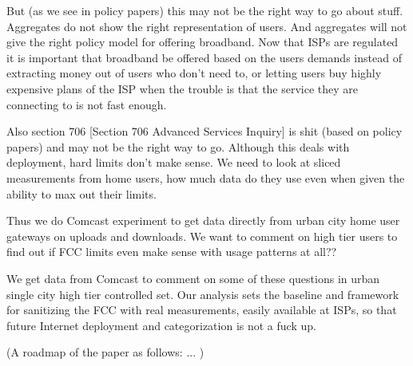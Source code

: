 

But (as we see in policy papers) this may not be the right way to go about stuff. Aggregates do not show the right representation of users. And aggregates will not give the right policy model for offering broadband. Now that ISPs are regulated it is important that broadband be offered based on the users demands instead of extracting money out of users who don't need to, or letting users buy highly expensive plans of the ISP when the trouble is that the service they are connecting to is not fast enough.

Also section 706 [Section 706 Advanced Services Inquiry] is shit (based on policy papers) and may not be the right way to go. Although this deals with deployment, hard limits don't make sense. We need to look at sliced measurements from home users, how much data do they use even when given the ability to max out their limits. 

Thus we do Comcast experiment to get data directly from urban city home user gateways on uploads and downloads. We want to comment on high tier users to find out if FCC limits even make sense with usage patterns at all??

We get data from Comcast to comment on some of these questions in urban single city high tier controlled set. Our analysis sets the baseline and framework for sanitizing the FCC with real measurements, easily available at ISPs, so that future Internet deployment and categorization is not a fuck up.

(A roadmap of the paper as follows: ... )